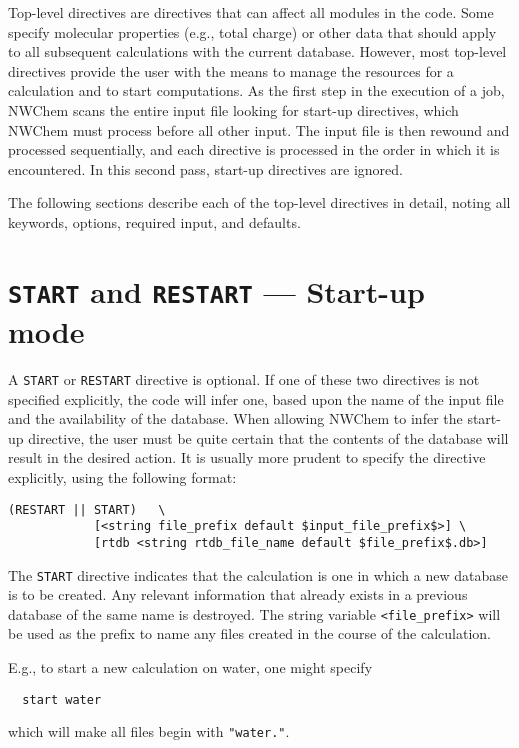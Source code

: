 %
%
\label{sec:toplevel}

Top-level directives are directives that can affect all modules in the
code.  Some specify molecular properties (e.g., total charge) or other
data that should apply to all subsequent calculations with the current
database.  However, most top-level directives provide the user with
the means to manage the resources for a calculation and to start
computations.  As the first step in the execution of a job, NWChem
scans the entire input file looking for start-up directives, which
NWChem must process before all other input.  The input file is then
rewound and processed sequentially, and each directive is processed in
the order in which it is encountered.  In this second pass, start-up
directives are ignored.

The following sections describe each of the top-level directives in
detail, noting all keywords, options, required input, and defaults.

\section{{\tt START} and {\tt RESTART} --- Start-up mode}
\label{sec:start}

A {\tt START} or {\tt RESTART} directive is
optional.  If one of these two directives is not specified
explicitly, the code will infer one, based upon the name of the
input file and the availability of the database.  When allowing NWChem
to infer the start-up directive, the user must be quite certain that
the contents of the database will result in the desired action.  It
is usually more prudent to specify the directive explicitly, using the
following format:

\begin{verbatim}
(RESTART || START)   \
            [<string file_prefix default $input_file_prefix$>] \
            [rtdb <string rtdb_file_name default $file_prefix$.db>]
\end{verbatim}

The \verb+START+ directive indicates that the calculation is one in
which a new database is to be created.  Any relevant information that
already exists in a previous database of the same name is destroyed.
The string variable {\tt <file\_prefix>} will be used as the prefix to
name any files created in the course of the calculation.  

E.g., to start a new calculation on water, one might specify
\begin{verbatim}
  start water
\end{verbatim}
which will make all files begin with {\tt "water."}.

